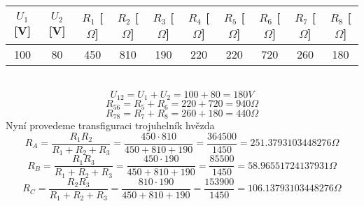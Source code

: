 \documentclass{article}
\begin{document}
\begin{tabular}{| c | c | c | c | c | c | c | c | c | c |}
  \hline
   $U_{1}$[V] & $U_{2}$ [V] & $R_{1}$ [$\Omega$]& $R_{2}$ [$\Omega$]& $R_{3}$ [$\Omega$]& $R_{4}$ [$\Omega$]& $R_{5}$ [$\Omega$]& $R_{6}$ [$\Omega$]& $R_{7}$ [$\Omega$]& $R_{8}$ [$\Omega$]\\
  \hline
  100 & 80 & 450 & 810 & 190 & 220 & 220 & 720 & 260 & 180\\
  \hline
\end{tabular}\\
\[
  U_{12} = U_{1} + U_{2} = 100 + 80 = 180V
\]
\[
  R_{56} = R_{5} + R_{6} = 220 + 720 = 940\Omega
\]
\[
  R_{78} = R_{7} + R_{8} = 260 + 180 = 440\Omega
\]
Nyní provedeme transfiguraci  trojuhelník hvězda
\[
  R_{A} = \displaystyle\frac{R_{1}R_{2}}{R_{1}+R_{2}+R_{3}}
  = \displaystyle\frac{450 \cdot 810}{450 + 810 + 190}
  = \displaystyle\frac{364500}{1450}
  = 251.3793103448276 \Omega
\]
\[
  R_{B} = \displaystyle\frac{R_{1}R_{3}}{R_{1}+R_{2}+R_{3}}
  = \displaystyle\frac{450 \cdot 190}{450 + 810 + 190}
  = \displaystyle\frac{85500}{1450}
  = 58.96551724137931 \Omega
\]
\[
  R_{C} = \displaystyle\frac{R_{2}R_{3}}{R_{1}+R_{2}+R_{3}}
  = \displaystyle\frac{810 \cdot 190}{450 + 810 + 190}
  = \displaystyle\frac{153900}{1450}
  = 106.13793103448276 \Omega
\]
\end{document}
